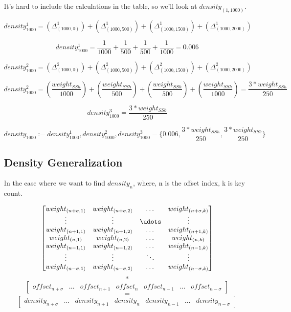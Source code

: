 It's hard to include the calculations in the table, so we'll look at $density_{(1,1000)}$.

$$density_{1000}^1 =
(\Delta_{(1000,0)}^{1}) +
(\Delta_{(1000,500)}^{1}) +
(\Delta_{(1000,1500)}^{1}) +
(\Delta_{(1000,2000)}^{1})$$

$$density_{1000}^1 =
\frac{1}{1000} +
\frac{1}{500} +
\frac{1}{500} +
\frac{1}{1000} = 0.006$$

$$density_{1000}^2 = 
(\Delta_{(1000,0)}^{2}) +
(\Delta_{(1000,500)}^{2}) +
(\Delta_{(1000,1500)}^{2}) +
(\Delta_{(1000,2000)}^{2})$$

$$ density_{1000}^2 = 
(\frac{weight_{SSh}}{1000}) +
(\frac{weight_{SSh}}{500}) +
(\frac{weight_{SSh}}{500}) +
(\frac{weight_{SSh}}{1000}) =
\frac{3 * weight_{SSh}}{250} $$

$$ density_{1000}^3 =
\frac{3 * weight_{SSb}}{250} $$

$$ density_{1000} :=
{density_{1000}^1, density_{1000}^2, density_{1000}^3} =
\lbrace0.006,
\frac{3 * weight_{SSh}}{250},
\frac{3 * weight_{SSb}}{250}\rbrace $$

\subsection{Density Generalization}

In the case where we want to find $density_n$, where, n is the offset index, k is key count.

\[ 	
\begin{bmatrix}
	weight_{(n+\sigma,1)} & weight_{(n+\sigma,2)} & \dots  & weight_{(n+\sigma,k)} \\
	\vdots & \vdots & \udots & \vdots \\
	weight_{(n+1,1)} & weight_{(n+1,2)} & \dots  & weight_{(n+1,k)} \\
	weight_{(n,1)} & weight_{(n,2)} & \dots  & weight_{(n,k)} \\
    weight_{(n-1,1)} & weight_{(n-1,2)} & \dots  & weight_{(n-1,k)} \\
    \vdots & \vdots & \ddots & \vdots \\
    weight_{(n-\sigma,1)} & weight_{(n-\sigma,2)} & \dots  & weight_{(n-\sigma,k)}
\end{bmatrix}
\]
$$ * $$
\[
\begin{bmatrix}
	offset_{n+\sigma} & \dots & offset_{n+1} & offset_{n} & offset_{n-1} & \dots & offset_{n-\sigma} 
\end{bmatrix}
\]
$$ = $$
\[
\begin{bmatrix}
	density_{n+\sigma} & \dots & density_{n+1} & density_{n} & density_{n-1} & \dots & density_{n-\sigma} 
\end{bmatrix}
\]

